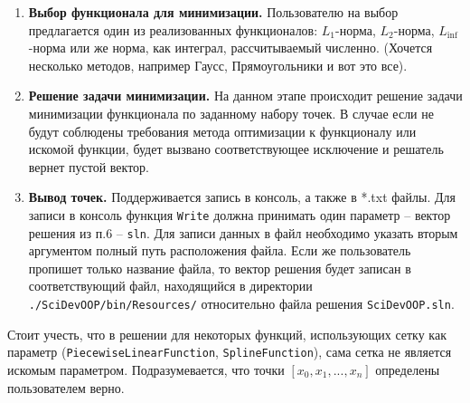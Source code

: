 \begin{enumerate}
	\item \textbf{Выбор функционала для минимизации.} Пользователю на выбор предлагается один из реализованных функционалов: $L_1$-норма, $L_2$-норма, $L_{\inf}$-норма или же норма, как интеграл, рассчитываемый численно. (Хочется несколько методов, например Гаусс, Прямоугольники и вот это все).
	\item \textbf{Решение задачи минимизации.} На данном этапе происходит решение задачи минимизации функционала по заданному набору точек. В случае если не будут соблюдены требования метода оптимизации к функционалу или искомой функции, будет вызвано соответствующее исключение и решатель вернет пустой вектор.
	\item \textbf{Вывод точек.} Поддерживается запись в консоль, а также в *.txt файлы. Для записи в консоль функция \texttt{Write} должна принимать один параметр -- вектор решения из п.6 -- \texttt{sln}. Для записи данных в файл необходимо указать вторым аргументом полный путь расположения файла. Если же пользователь пропишет только название файла, то вектор решения будет записан в соответствующий файл, находящийся в директории \texttt{./SciDevOOP/bin/Resources/} относительно файла решения \texttt{SciDevOOP.sln}.
\end{enumerate}

Стоит учесть, что в решении для некоторых функций, использующих сетку как параметр (\texttt{PiecewiseLinearFunction}, \texttt{SplineFunction}), сама сетка не является искомым параметром. Подразумевается, что точки $[x_0, x_1, ..., x_n]$ определены пользователем верно.